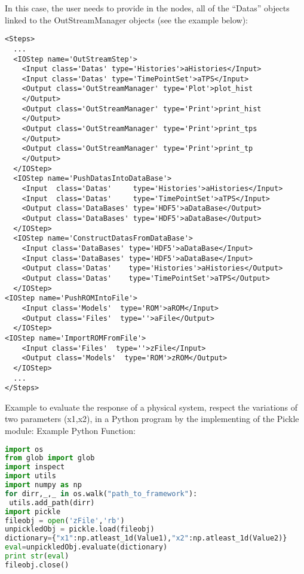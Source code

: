 In this case, the user needs to provide in the  nodes, all of the 
``Datas'' objects linked to the OutStreamManager objects (see the example 
below):
\begin{lstlisting}[style=XML,morekeywords={class}]
<Steps>
  ...
  <IOStep name='OutStreamStep'>
    <Input class='Datas' type='Histories'>aHistories</Input>
    <Input class='Datas' type='TimePointSet'>aTPS</Input>
    <Output class='OutStreamManager' type='Plot'>plot_hist
    </Output>
    <Output class='OutStreamManager' type='Print'>print_hist
    </Output>
    <Output class='OutStreamManager' type='Print'>print_tps
    </Output>
    <Output class='OutStreamManager' type='Print'>print_tp
    </Output>
  </IOStep>
  <IOStep name='PushDatasIntoDataBase'>
    <Input  class='Datas'     type='Histories'>aHistories</Input>
    <Input  class='Datas'     type='TimePointSet'>aTPS</Input>
    <Output class='DataBases' type='HDF5'>aDataBase</Output>
    <Output class='DataBases' type='HDF5'>aDataBase</Output>
  </IOStep>
  <IOStep name='ConstructDatasFromDataBase'>
    <Input class='DataBases' type='HDF5'>aDataBase</Input>
    <Input class='DataBases' type='HDF5'>aDataBase</Input>
    <Output class='Datas'    type='Histories'>aHistories</Output>
    <Output class='Datas'    type='TimePointSet'>aTPS</Output>
  </IOStep>
<IOStep name='PushROMIntoFile'>
    <Input class='Models'  type='ROM'>aROM</Input>
    <Output class='Files'  type=''>aFile</Output>
  </IOStep>
<IOStep name='ImportROMFromFile'>
    <Input class='Files'  type=''>zFile</Input>
    <Output class='Models'  type='ROM'>zROM</Output>
  </IOStep>
  ...
</Steps>
\end{lstlisting}
%
Example to evaluate the response of a physical system, respect the variations of two parameters (x1,x2),
 in a Python program by the implementing of the Pickle module: 
%
Example Python Function:
\begin{lstlisting}[language=python]
import os
from glob import glob
import inspect
import utils
import numpy as np
for dirr,_,_ in os.walk("path_to_framework"):
 utils.add_path(dirr)
import pickle
fileobj = open('zFile','rb')
unpickledObj = pickle.load(fileobj)
dictionary={"x1":np.atleast_1d(Value1),"x2":np.atleast_1d(Value2)}
eval=unpickledObj.evaluate(dictionary)
print str(eval)
fileobj.close()
\end{lstlisting}

